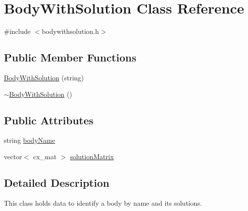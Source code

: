 \hypertarget{class_body_with_solution}{\section{Body\-With\-Solution Class Reference}
\label{class_body_with_solution}
}


{\ttfamily \#include $<$bodywithsolution.\-h$>$}

\subsection*{Public Member Functions}
\begin{DoxyCompactItemize}
\item 
\hyperlink{class_body_with_solution_a6f05c16f0cf4aa726bb60fd3e3b0af1b}{Body\-With\-Solution} (string)
\item 
\hyperlink{class_body_with_solution_ae923a12ef7a43de3667d2370a450e60e}{$\sim$\-Body\-With\-Solution} ()
\end{DoxyCompactItemize}
\subsection*{Public Attributes}
\begin{DoxyCompactItemize}
\item 
string \hyperlink{class_body_with_solution_ad7d65251341438956aba237632a65850}{body\-Name}
\item 
vector$<$ cx\-\_\-mat $>$ \hyperlink{class_body_with_solution_ab137fb3c24fe281c9375146d2e170667}{solution\-Matrix}
\end{DoxyCompactItemize}


\subsection{Detailed Description}
This class holds data to identify a body by name and its solutions. 

